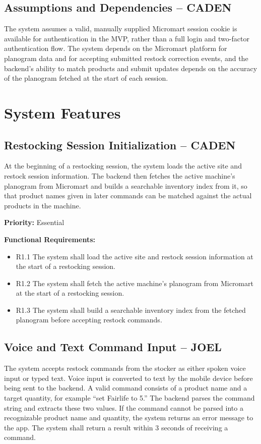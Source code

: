 \documentclass{scrreprt}
\begin{document}
\section{Assumptions and Dependencies -- CADEN}
The system assumes a valid, manually supplied Micromart session cookie is available for authentication in the MVP, rather than a full login and two-factor authentication flow. The system depends on the Micromart platform for planogram data and for accepting submitted restock correction events, and the backend's ability to match products and submit updates depends on the accuracy of the planogram fetched at the start of each session.

\chapter{System Features}

\section{Restocking Session Initialization -- CADEN}
At the beginning of a restocking session, the system loads the active site and restock session information. The backend then fetches the active machine's planogram from Micromart and builds a searchable inventory index from it, so that product names given in later commands can be matched against the actual products in the machine.

\textbf{Priority:} Essential

\textbf{Functional Requirements:}
\begin{itemize}
    \item R1.1 The system shall load the active site and restock session information at the start of a restocking session.
    \item R1.2 The system shall fetch the active machine's planogram from Micromart at the start of a restocking session.
    \item R1.3 The system shall build a searchable inventory index from the fetched planogram before accepting restock commands.
\end{itemize}

\section{Voice and Text Command Input -- JOEL}
The system accepts restock commands from the stocker as either spoken 
voice input or typed text. Voice input is converted to text by the 
mobile device before being sent to the backend. A valid command 
consists of a product name and a target quantity, for example 
``set Fairlife to 5.'' The backend parses the command string and 
extracts these two values. If the command cannot be parsed into a 
recognizable product name and quantity, the system returns an error 
message to the app. The system shall return a result within 3 seconds 
of receiving a command.
\end{document}
